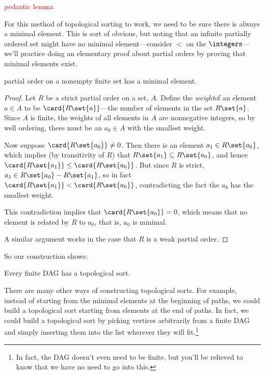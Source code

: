 \begin{editingnotes}
\textcolor{red}{pedantic lemma}

For this method of topological sorting to work, we need to be sure
there is always a minimal element.  This is sort of obvious, but
noting that an infinite partially ordered set might have no minimal
element---consider $<$ on the $\integers$---we'll practice doing an
elementary proof about partial orders by proving that minimal elements
exist.

\begin{lemma}\label{finmin}
   partial order on a nonempty finite set
  has a minimal element.

\begin{proof} Let $R$ be a strict partial order on a set, $A$.  Define
 the \emph{weight}of an element $a \in A$ to be
 $\card{R\set{a}}$---the number of elements in the set $R\set{a}$.
 Since $A$ is finite, the weights of all elements in $A$ are
 nonnegative integers, so by well ordering, there must be an $a_0 \in
 A$ with the smallest weight.

Now suppose $\card{R\set{a_0}} \neq 0$.  Then there is an element $a_1 \in
R\set{a_0}$, which implies (by transitivity of $R$) that $R\set{a_1}
\subseteq R\set{a_0}$, and hence $\card{R\set{a_1}} \leq
\card{R\set{a_0}}$.  But since $R$ is strict, $a_1 \in R\set{a_0} -
R\set{a_1}$, so in fact $\card{R\set{a_1}} < \card{R\set{a_0}}$,
contradicting the fact the $a_0$ has the smallest weight.

This contradiction implies that $\card{R\set{a_0}} = 0$, which means that
no element is related by $R$ to $a_0$, that is, $a_0$ is minimal.

A similar argument works in the case that $R$ is a weak partial order.

\end{proof}
\end{lemma}

\end{editingnotes}

So our construction shows:

\begin{theorem}\label{thm:topological}
Every finite DAG has a topological sort.
\end{theorem}

There are many other ways of constructing topological sorts.  For
example, instead of starting from the minimal elements at the
beginning of paths, we could build a topological sort starting from
 elements at the end of paths.  In fact, we could build
a topological sort by picking vertices arbitrarily from a finite DAG
and simply inserting them into the list wherever they will
fit.\footnote{In fact, the DAG doesn't even need to be finite, but
  you'll be relieved to know that we have no need to go into this.}

